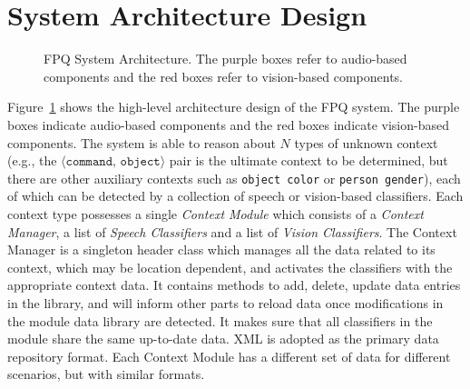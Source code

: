 \documentclass{llncs}
\begin{document}
\section{System Architecture Design}
\begin{figure} [t]
\caption{FPQ System Architecture. The purple boxes refer to audio-based components and the red boxes refer to vision-based components.}
\label{fig:system_arch}
\end{figure}
\label{sec:system_arch}
Figure~\ref{fig:system_arch} shows the high-level architecture design of the FPQ system.  The purple boxes indicate audio-based components and the red boxes indicate vision-based components. 
The system is able to reason about $N$ types of unknown context (e.g.,
the $\langle \texttt{command, object}\rangle$ pair is the ultimate
context to be determined, but there are other auxiliary contexts such
as \texttt{object color} or \texttt{person gender}), each of which can
be detected by a collection of speech or vision-based classifiers.
Each context type possesses a single {\em Context Module} which
consists of a {\em Context Manager}, a list of {\em Speech
  Classifiers} and a list of {\em Vision Classifiers}.  The Context
Manager is a singleton header class which manages all the data related
to its context, which may be location dependent, and activates the
classifiers with the appropriate context data.  It contains methods to
add, delete, update data entries in the library, and will inform other
parts to reload data once modifications in the module data library are
detected. It makes sure that all classifiers in the module share the
same up-to-date data. XML is adopted as the primary data repository
format. Each Context Module has a different set of data for different
scenarios, but with similar formats.
\end{document}

